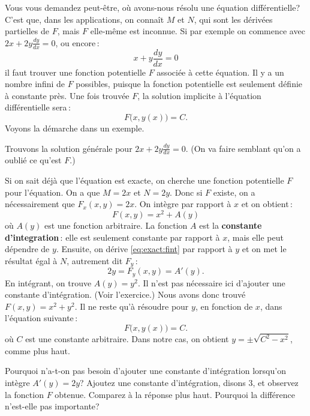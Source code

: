 Vous vous demandez peut-être, où avons-nous résolu une équation différentielle?  C'est que, dans les applications, on connaît $M$ et $N$, qui sont les dérivées partielles de $F$, mais $F$ elle-même est inconnue.  
Si par exemple on commence avec 
$2x + 2y \frac{dy}{dx} = 0$, ou encore\,:
\begin{equation*}
x + y \frac{dy}{dx} = 0 
\end{equation*}
il faut trouver une fonction potentielle $F$ associée à cette équation.  Il y a un nombre infini de $F$ possibles, puisque la fonction potentielle est seulement définie à constante près. 
Une fois trouvée $F$, la solution implicite à l'équation différentielle sera\,: 
\begin{equation*}
F\bigl(x,y(x)\bigr) = C.
\end{equation*}
Voyons la démarche dans un exemple. 
\begin{example}
Trouvons la solution générale pour
$2x + 2y \frac{dy}{dx} = 0$.  (On va faire semblant qu'on a oublié ce qu'est $F$.)

Si on sait déjà que l'équation est exacte, on cherche une fonction potentielle $F$ pour l'équation.
On a que $M = 2x$ et $N=2y$.
Donc si $F$ existe, on a nécessairement que 
$F_x (x,y) = 2x$.
On intègre par rapport à $x$ et on obtient\,: 
\begin{equation} \label{eq:exact:fint}
F(x,y) = x^2 + A(y) 
\end{equation}
où $A(y)$ est une fonction arbitraire.  La fonction $A$ est la {\bf constante d'integration}\,:  elle est seulement constante par rapport à $x$, mais elle peut dépendre de $y$.  Ensuite, on dérive \eqref{eq:exact:fint} par rapport à $y$ et on met le résultat égal à $N$, autrement dit $F_y$\,:
\begin{equation*}
2y = F_y (x,y) = A'(y) .
\end{equation*}
En intégrant, on trouve $A(y) = y^2$.  Il n'est pas nécessaire ici d'ajouter une constante d'intégration.  (Voir l'exercice.)    Nous avons donc trouvé $F(x,y) = x^2+y^2$.
Il ne reste qu'à résoudre pour $y$, en fonction de $x$, dans l'équation suivante\,: 
\begin{equation*}
F\bigl(x,y(x)\bigr) = C .
\end{equation*}
où $C$ est une constante arbitraire. Dans notre cas, on obtient $y = \pm \sqrt{C^2-x^2}$, comme plus haut.
\end{example}

\begin{exercise}\label{exer:exact}
Pourquoi n'a-t-on pas besoin d'ajouter une constante d'intégration lorsqu'on intègre $A'(y)
= 2y$?  Ajoutez une constante d'intégration, disons $3$, et observez la fonction $F$ obtenue.
Comparez à la réponse plus haut.  Pourquoi la différence n'est-elle pas importante?
\end{exercise}

